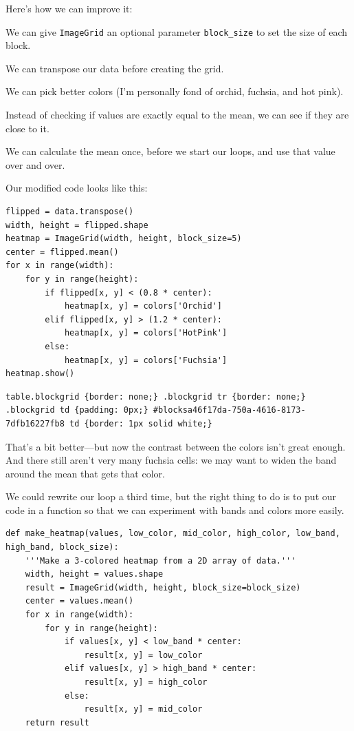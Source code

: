 \documentclass{book}
\begin{document}
Here's how we can improve it:

\begin{swcenumerate}
\item
  We can give \texttt{ImageGrid} an optional parameter
  \texttt{block\_size} to set the size of each block.
\item
  We can transpose our data before creating the grid.
\item
  We can pick better colors (I'm personally fond of orchid, fuchsia, and
  hot pink).
\item
  Instead of checking if values are exactly equal to the mean, we can
  see if they are close to it.
\item
  We can calculate the mean once, before we start our loops, and use
  that value over and over.
\end{swcenumerate}

Our modified code looks like this:

\begin{verbatim}
flipped = data.transpose()
width, height = flipped.shape
heatmap = ImageGrid(width, height, block_size=5)
center = flipped.mean()
for x in range(width):
    for y in range(height):
        if flipped[x, y] < (0.8 * center):
            heatmap[x, y] = colors['Orchid']
        elif flipped[x, y] > (1.2 * center):
            heatmap[x, y] = colors['HotPink']
        else:
            heatmap[x, y] = colors['Fuchsia']
heatmap.show()
\end{verbatim}

\begin{verbatim}
table.blockgrid {border: none;} .blockgrid tr {border: none;} .blockgrid td {padding: 0px;} #blocksa46f17da-750a-4616-8173-7dfb16227fb8 td {border: 1px solid white;}
\end{verbatim}

That's a bit better---but now the contrast between the colors isn't
great enough. And there still aren't very many fuchsia cells: we may
want to widen the band around the mean that gets that color.

We could rewrite our loop a third time, but the right thing to do is to
put our code in a function so that we can experiment with bands and
colors more easily.

\begin{verbatim}
def make_heatmap(values, low_color, mid_color, high_color, low_band, high_band, block_size):
    '''Make a 3-colored heatmap from a 2D array of data.'''
    width, height = values.shape
    result = ImageGrid(width, height, block_size=block_size)
    center = values.mean()
    for x in range(width):
        for y in range(height):
            if values[x, y] < low_band * center:
                result[x, y] = low_color
            elif values[x, y] > high_band * center:
                result[x, y] = high_color
            else:
                result[x, y] = mid_color
    return result
\end{verbatim}
\end{document}
